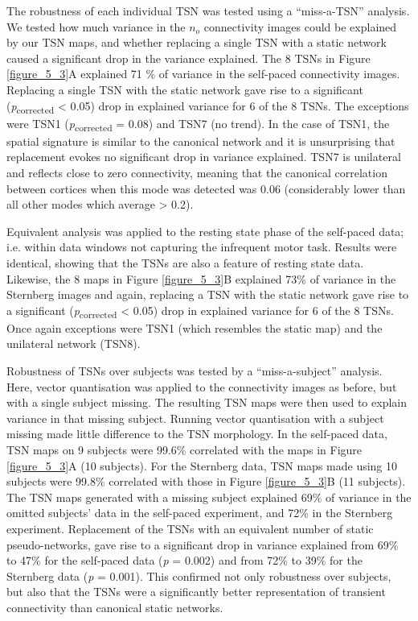 The robustness of each individual TSN was tested using a “miss-a-TSN” analysis. We tested how much variance in the $n_o$ connectivity images could be explained by our TSN maps, and whether replacing a single TSN with a static network caused a significant drop in the variance explained. The 8 TSNs in Figure \ref{figure_5_3}A explained 71  \% of variance in the self-paced connectivity images. Replacing a single TSN with the static network gave rise to a significant (\textit{p}\textsubscript{corrected} < 0.05) drop in explained variance for 6 of the 8 TSNs. The exceptions were TSN1 (\textit{p}\textsubscript{corrected} = 0.08) and TSN7 (no trend). In the case of TSN1, the spatial signature is similar to the canonical network and it is unsurprising that replacement evokes no significant drop in variance explained. TSN7 is unilateral and reflects close to zero connectivity, meaning that the canonical correlation between cortices when this mode was detected was 0.06 (considerably lower than all other modes which average > 0.2). 

Equivalent analysis was applied to the resting state phase of the self-paced data; i.e. within data windows not capturing the infrequent motor task. Results were identical, showing that the TSNs are also a feature of resting state data. Likewise, the 8 maps in Figure \ref{figure_5_3}B explained  73\% of variance in the Sternberg images and again, replacing a TSN with the static network gave rise to a significant (\textit{p}\textsubscript{corrected} < 0.05) drop in explained variance for 6 of the 8 TSNs. Once again exceptions were TSN1 (which resembles the static map) and the unilateral network (TSN8). 

Robustness of TSNs over subjects was tested by a “miss-a-subject” analysis. Here, vector quantisation was applied to the connectivity images as before, but with a single subject missing. The resulting TSN maps were then used to explain variance in that missing subject. Running vector quantisation with a subject missing made little difference to the TSN morphology. In the self-paced data, TSN maps on 9 subjects were 99.6\% correlated with the maps in Figure \ref{figure_5_3}A (10 subjects). For the Sternberg data, TSN maps made using 10 subjects were  99.8\% correlated with those in Figure \ref{figure_5_3}B (11 subjects). The TSN maps generated with a missing subject explained  69\% of variance in the omitted subjects’ data in the self-paced experiment, and  72\% in the Sternberg experiment. Replacement of the TSNs with an equivalent number of static pseudo-networks, gave rise to a significant drop in variance explained from  69\% to  47\% for the self-paced data (\textit{p} = 0.002) and from  72\% to  39\% for the Sternberg data (\textit{p} = 0.001). This confirmed not only robustness over subjects, but also that the TSNs were a significantly better representation of transient connectivity than canonical static networks.

